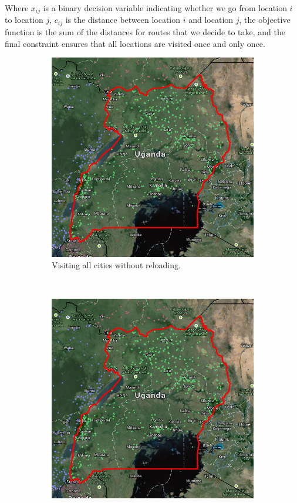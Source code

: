 \documentclass[a0,final]{a0poster}
\begin{document}
\begin{multicols}{3}
\noindent Where $x_{ij}$ is a binary decision variable indicating whether we go from location $i$ to location $j$, $c_{ij}$ is the distance between location $i$ and location $j$, the objective function is the sum of the distances for routes that we decide to take, and the final constraint ensures that all locations are visited once and only once.


\begin{figure}[H]
  \centering
  \begin{subfigure}[b]{0.5\columnwidth}
    \centering
    \includegraphics[width=\textwidth]{../write-up/figures/uganda}
    \caption{Visiting all cities without reloading.}
    \label{fig:a1}
  \end{subfigure}~\begin{subfigure}[b]{0.5\columnwidth}
    \centering
    \includegraphics[width=\textwidth]{../write-up/figures/uganda}

\end{subfigure}
\end{figure}
\end{multicols}
\end{document}
